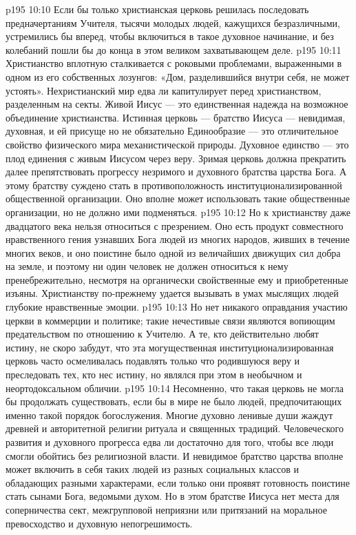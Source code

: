 \vs p195 10:10 Если бы только христианская церковь решилась последовать предначертаниям Учителя, тысячи молодых людей, кажущихся безразличными, устремились бы вперед, чтобы включиться в такое духовное начинание, и без колебаний пошли бы до конца в этом великом захватывающем деле.
\vs p195 10:11 Христианство вплотную сталкивается с роковыми проблемами, выраженными в одном из его собственных лозунгов: «Дом, разделившийся внутри себя, не может устоять». Нехристианский мир едва ли капитулирует перед христианством, разделенным на секты. Живой Иисус --- это единственная надежда на возможное объединение христианства. Истинная церковь --- братство Иисуса --- невидимая, духовная, и ей присуще  но не обязательно  Единообразие --- это отличительное свойство физического мира механистической природы. Духовное единство --- это плод единения с живым Иисусом через веру. Зримая церковь должна прекратить далее препятствовать прогрессу незримого и духовного братства царства Бога. А этому братству суждено стать  в противоположность институционализированной общественной организации. Оно вполне может использовать такие общественные организации, но не должно ими подменяться.
\vs p195 10:12 Но к христианству даже двадцатого века нельзя относиться с презрением. Оно есть продукт совместного нравственного гения узнавших Бога людей из многих народов, живших в течение многих веков, и оно поистине было одной из величайших движущих сил добра на земле, и поэтому ни один человек не должен относиться к нему пренебрежительно, несмотря на органически свойственные ему и приобретенные изъяны. Христианству по\hyp{}прежнему удается вызывать в умах мыслящих людей глубокие нравственные эмоции.
\vs p195 10:13 Но нет никакого оправдания участию церкви в коммерции и политике; такие нечестивые связи являются вопиющим предательством по отношению к Учителю. А те, кто действительно любят истину, не скоро забудут, что эта могущественная институционализированная церковь часто осмеливалась подавлять только что родившуюся веру и преследовать тех, кто нес истину, но являлся при этом в необычном и неортодоксальном обличии.
\vs p195 10:14 Несомненно, что такая церковь не могла бы продолжать существовать, если бы в мире не было людей, предпочитающих именно такой порядок богослужения. Многие духовно ленивые души жаждут древней и авторитетной религии ритуала и священных традиций. Человеческого развития и духовного прогресса едва ли достаточно для того, чтобы все люди смогли обойтись без религиозной власти. И невидимое братство царства вполне может включить в себя таких людей из разных социальных классов и обладающих разными характерами, если только они проявят готовность поистине стать сынами Бога, ведомыми духом. Но в этом братстве Иисуса нет места для соперничества сект, межгрупповой неприязни или притязаний на моральное превосходство и духовную непогрешимость.
